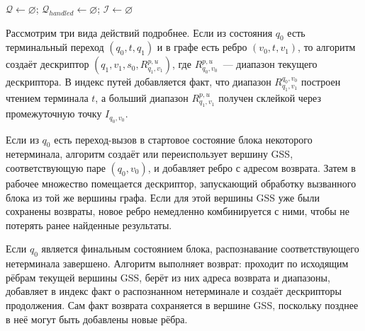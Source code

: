\begin{algorithm}[H]
    \footnotesize
    \caption{GLL-поиск путей на основе рекурсивного автомата}
    \label{lst:gll_rsm_cfpq}
    $\mathcal{Q} \gets \varnothing$; $\mathcal{Q}_{\mathit{handled}} \gets \varnothing$; $\mathcal{I} \gets \varnothing$\;
    \;
\end{algorithm}

Рассмотрим три вида действий подробнее. Если из состояния $q_0$ есть терминальный переход $(q_0,t,q_1)$ и в графе есть ребро $(v_0,t,v_1)$, то алгоритм создаёт дескриптор $(q_1,v_1,s_0,R^{p,u}_{q_1,v_1})$, где $R^{p,u}_{q_0,v_0}$~--- диапазон текущего дескриптора. В индекс путей добавляется факт, что диапазон $R^{q_0,v_0}_{q_1,v_1}$ построен чтением терминала $t$, а больший диапазон $R^{p,u}_{q_1,v_1}$ получен склейкой через промежуточную точку $I_{q_0,v_0}$.

Если из $q_0$ есть переход-вызов в стартовое состояние блока некоторого нетерминала, алгоритм создаёт или переиспользует вершину GSS, соответствующую паре $(q_0,v_0)$, и добавляет ребро с адресом возврата. Затем в рабочее множество помещается дескриптор, запускающий обработку вызванного блока из той же вершины графа. Если для этой вершины GSS уже были сохранены возвраты, новое ребро немедленно комбинируется с ними, чтобы не потерять ранее найденные результаты.

Если $q_0$ является финальным состоянием блока, распознавание соответствующего нетерминала завершено. Алгоритм выполняет возврат: проходит по исходящим рёбрам текущей вершины GSS, берёт из них адреса возврата и диапазоны, добавляет в индекс факт о распознанном нетерминале и создаёт дескрипторы продолжения. Сам факт возврата сохраняется в вершине GSS, поскольку позднее в неё могут быть добавлены новые рёбра.

